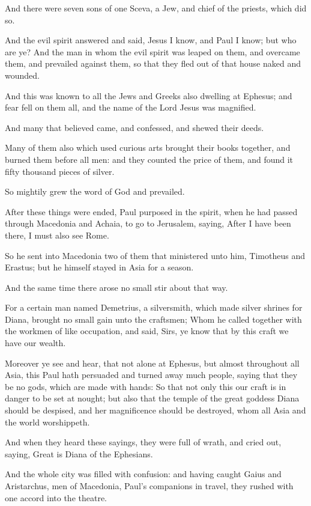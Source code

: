 \verse And there were seven sons of one Sceva, a Jew, and chief of the priests, which did so.

\verse And the evil spirit answered and said, Jesus I know, and Paul I know; but who are ye?  \verse And the man in whom the evil spirit was leaped on them, and overcame them, and prevailed against them, so that they fled out of that house naked and wounded.

\verse And this was known to all the Jews and Greeks also dwelling at Ephesus; and fear fell on them all, and the name of the Lord Jesus was magnified.

\verse And many that believed came, and confessed, and shewed their deeds.

\verse Many of them also which used curious arts brought their books together, and burned them before all men: and they counted the price of them, and found it fifty thousand pieces of silver.

\verse So mightily grew the word of God and prevailed.

\verse After these things were ended, Paul purposed in the spirit, when he had passed through Macedonia and Achaia, to go to Jerusalem, saying, After I have been there, I must also see Rome.

\verse So he sent into Macedonia two of them that ministered unto him, Timotheus and Erastus; but he himself stayed in Asia for a season.

\verse And the same time there arose no small stir about that way.

\verse For a certain man named Demetrius, a silversmith, which made silver shrines for Diana, brought no small gain unto the craftsmen; \verse Whom he called together with the workmen of like occupation, and said, Sirs, ye know that by this craft we have our wealth.

\verse Moreover ye see and hear, that not alone at Ephesus, but almost throughout all Asia, this Paul hath persuaded and turned away much people, saying that they be no gods, which are made with hands: \verse So that not only this our craft is in danger to be set at nought; but also that the temple of the great goddess Diana should be despised, and her magnificence should be destroyed, whom all Asia and the world worshippeth.

\verse And when they heard these sayings, they were full of wrath, and cried out, saying, Great is Diana of the Ephesians.

\verse And the whole city was filled with confusion: and having caught Gaius and Aristarchus, men of Macedonia, Paul's companions in travel, they rushed with one accord into the theatre.

